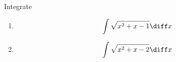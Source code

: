 Integrate
\begin{enumerate}
\item 
\[
\int \sqrt{x^2+x-1}\diff x
\]
\item 
\[
\int \sqrt{x^2+x-2}\diff x
\]
\end{enumerate}

